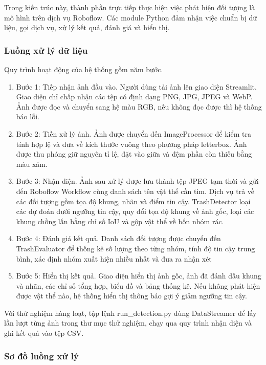 \documentclass[a4paper,13pt]{extarticle}
\begin{document}
Trong kiến trúc này, thành phần trực tiếp thực hiện việc phát hiện đối tượng là mô hình trên dịch vụ Roboflow. Các module Python đảm nhận việc chuẩn bị dữ liệu, gọi dịch vụ, xử lý kết quả, đánh giá và hiển thị.

\subsubsection{Luồng xử lý dữ liệu}
Quy trình hoạt động của hệ thống gồm năm bước.
\begin{enumerate}
    \item Bước 1: Tiếp nhận ảnh đầu vào. Người dùng tải ảnh lên giao diện Streamlit. Giao diện chỉ chấp nhận các tệp có định dạng PNG, JPG, JPEG và WebP. Ảnh được đọc và chuyển sang hệ màu RGB, nếu không đọc được thì hệ thống báo lỗi.
    \item Bước 2: Tiền xử lý ảnh. Ảnh được chuyển đến ImageProcessor để kiểm tra tính hợp lệ và đưa về kích thước vuông theo phương pháp letterbox. Ảnh được thu phóng giữ nguyên tỉ lệ, đặt vào giữa và đệm phần còn thiếu bằng màu xám.

    \item Bước 3: Nhận diện. Ảnh sau xử lý được lưu thành tệp JPEG tạm thời và gửi đến Roboflow Workflow cùng danh sách tên vật thể cần tìm. Dịch vụ trả về các đối tượng gồm tọa độ khung, nhãn và điểm tin cậy. TrashDetector loại các dự đoán dưới ngưỡng tin cậy, quy đổi tọa độ khung về ảnh gốc, loại các khung chồng lấn bằng chỉ số IoU và gộp vật thể về bốn nhóm rác.
    \item Bước 4: Đánh giá kết quả. Danh sách đối tượng được chuyển đến TrashEvaluator để thống kê số lượng theo từng nhóm, tính độ tin cậy trung bình, xác định nhóm xuất hiện nhiều nhất và đưa ra nhận xét
    \item Bước 5: Hiển thị kết quả. Giao diện hiển thị ảnh gốc, ảnh đã đánh dấu khung và nhãn, các chỉ số tổng hợp, biểu đồ và bảng thống kê. Nếu không phát hiện được vật thể nào, hệ thống hiển thị thông báo gợi ý giảm ngưỡng tin cậy.
    
\end{enumerate}

Với thử nghiệm hàng loạt, tập lệnh run\_detection.py dùng DataStreamer để lấy lần lượt từng ảnh trong thư mục thử nghiệm, chạy qua quy trình nhận diện và ghi kết quả vào tệp CSV.
\subsubsection{Sơ đồ luồng xử lý}
\end{document}
